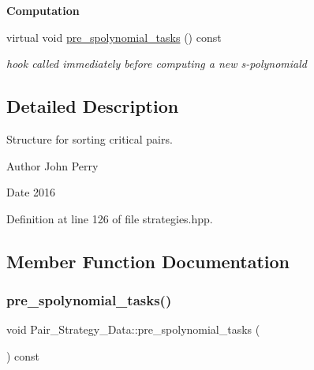 \begin{Indent}\textbf{ Computation}\par
\begin{DoxyCompactItemize}
\item 
virtual void \hyperlink{class_pair___strategy___data_a15fdaa9fa3cc0a259e7dd29df1940819}{pre\+\_\+spolynomial\+\_\+tasks} () const
\begin{DoxyCompactList}\small\item\em hook called immediately before computing a new s-\/polynomiald \end{DoxyCompactList}\end{DoxyCompactItemize}
\end{Indent}


\subsection{Detailed Description}
Structure for sorting critical pairs. 

\begin{DoxyAuthor}{Author}
John Perry 
\end{DoxyAuthor}
\begin{DoxyDate}{Date}
2016 
\end{DoxyDate}


Definition at line 126 of file strategies.\+hpp.



\subsection{Member Function Documentation}
\mbox{\label{class_pair___strategy___data_a15fdaa9fa3cc0a259e7dd29df1940819}} 
\subsubsection{\texorpdfstring{pre\+\_\+spolynomial\+\_\+tasks()}{pre\_spolynomial\_tasks()}}
{\footnotesize\ttfamily void Pair\+\_\+\+Strategy\+\_\+\+Data\+::pre\+\_\+spolynomial\+\_\+tasks (\begin{DoxyParamCaption}{ }\end{DoxyParamCaption}) const\hspace{0.3cm}{\ttfamily [virtual]}}



